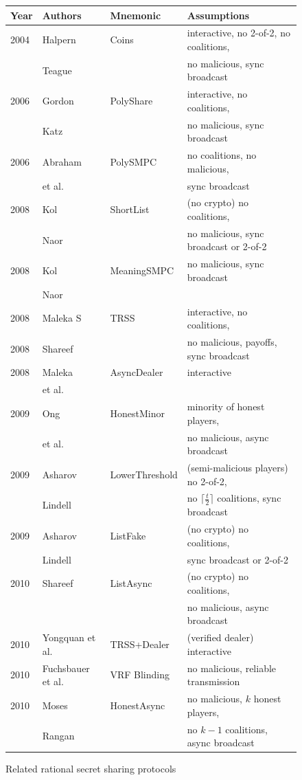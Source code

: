\documentclass[12pt]{dalcsthesis}
\begin{document}
\begin{figure}
\caption{Related rational secret sharing protocols}
\label{fig:Related}
\begin{tabular}{|l|l|l|l|}
  \hline
  Year & Authors 			& Mnemonic & Assumptions \\
  \hline
  \hline
  2004 & Halpern		 	& Coins		& interactive, no 2-of-2, no coalitions,\\
  	   & Teague 			& 			& no malicious, sync broadcast\\
  \hline
  2006 & Gordon				& PolyShare	& interactive, no coalitions,\\
  	   & Katz 				& 			& no malicious, sync broadcast\\
  \hline
  2006 & Abraham		 	& PolySMPC  & no coalitions, no malicious,\\
  	   & et al. 			& 			& sync broadcast \\
  \hline
  2008 & Kol				& ShortList & (no crypto) no coalitions,\\
  	   & Naor 				& 			& no malicious, sync broadcast or 2-of-2\\
  \hline
  2008 & Kol 				&MeaningSMPC& no malicious, sync broadcast \\
  	   & Naor 				&			& \\
  \hline
  2008 & Maleka S			& TRSS 		& interactive, no coalitions, \\
  2008 & Shareef 			& 			& no malicious, payoffs, sync broadcast \\
  \hline
  2008 & Maleka 	 		&AsyncDealer& interactive\\
  	   & et al. 			&			&\\
  \hline
  2009 & Ong		 		&HonestMinor& minority of honest players, \\
  	   & et al. 			&			& no malicious, async broadcast \\
  \hline
  2009 & Asharov 			&LowerThreshold& (semi-malicious players) no 2-of-2,\\
  	   & Lindell 			& 			& no $\lceil \frac{t}{2} \rceil$ coalitions, sync broadcast\\
  \hline
  2009 & Asharov 			& ListFake 	& (no crypto) no coalitions,\\
  	   & Lindell 			& 			& sync broadcast or 2-of-2\\
  \hline
  2010 & Shareef 			& ListAsync & (no crypto) no coalitions,\\
  	   & 	 	 			& 			& no malicious, async broadcast\\
  \hline
  2010 & Yongquan et al. 	&TRSS+Dealer& (verified dealer) interactive\\
  \hline
  2010 & Fuchsbauer et al. 	&VRF Blinding& no malicious, reliable transmission\\
  \hline
  2010 & Moses				&HonestAsync& no malicious, $k$ honest players,\\
  	   & Rangan 			&			& no $k-1$ coalitions, async broadcast\\
  \hline
\end{tabular}
\end{figure}
\end{document}
